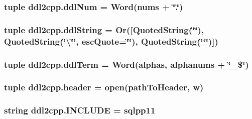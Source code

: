 \subsubsection[{ddl\+Num}]{\setlength{\rightskip}{0pt plus 5cm}tuple ddl2cpp.\+ddl\+Num = Word(nums + \char`\"{}.\char`\"{})}\label{namespaceddl2cpp_a4200c1285ee30e3c5069a13092e36b7b}
\hypertarget{namespaceddl2cpp_ac99a10e162c5dca8118f8f0a0661e378}{}
\subsubsection[{ddl\+String}]{\setlength{\rightskip}{0pt plus 5cm}tuple ddl2cpp.\+ddl\+String = Or(\mbox{[}Quoted\+String(\char`\"{}\textquotesingle{}\char`\"{}), Quoted\+String(\char`\"{}\textbackslash{}\char`\"{}\char`\"{}, esc\+Quote=\textquotesingle{}\char`\"{}\char`\"{}\textquotesingle{}), Quoted\+String(\char`\"{}`\char`\"{})\mbox{]})}\label{namespaceddl2cpp_ac99a10e162c5dca8118f8f0a0661e378}
\hypertarget{namespaceddl2cpp_afdb0a60da961822931aa989528d42409}{}
\subsubsection[{ddl\+Term}]{\setlength{\rightskip}{0pt plus 5cm}tuple ddl2cpp.\+ddl\+Term = Word(alphas, alphanums + \char`\"{}\+\_\+\$\char`\"{})}\label{namespaceddl2cpp_afdb0a60da961822931aa989528d42409}
\hypertarget{namespaceddl2cpp_af8987a7b7aa171a62a294d565d63504f}{}
\subsubsection[{header}]{\setlength{\rightskip}{0pt plus 5cm}tuple ddl2cpp.\+header = open({\bf path\+To\+Header}, \textquotesingle{}w\textquotesingle{})}\label{namespaceddl2cpp_af8987a7b7aa171a62a294d565d63504f}
\hypertarget{namespaceddl2cpp_afa346ef1079f78460941e4254c61fd1a}{}
\subsubsection[{I\+N\+C\+L\+U\+D\+E}]{\setlength{\rightskip}{0pt plus 5cm}string ddl2cpp.\+I\+N\+C\+L\+U\+D\+E = \textquotesingle{}sqlpp11\textquotesingle{}}\label{namespaceddl2cpp_afa346ef1079f78460941e4254c61fd1a}
\hypertarget{namespaceddl2cpp_a650881e2d9dfa08f94412038f5e7cc46}{}
